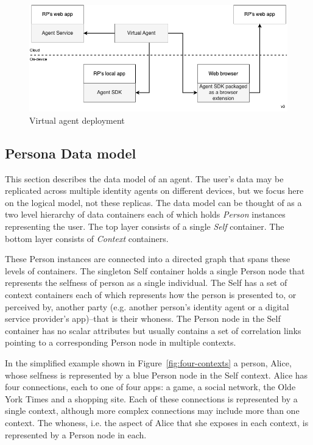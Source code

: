 \documentclass[11pt, oneside]{article}   	%
\begin{document}
\begin{figure}[htbp]
	\includegraphics[width=\textwidth]{./images/virtual-web-app.drawio.png}
	\caption{Virtual agent deployment}
	\label{fig:virtual-agent-deployment}
\end{figure}

\subsection{Persona Data model}\label{data_model_subsection} 

This section describes the data model of an agent. The user's data may be replicated across multiple identity agents on different devices, but we focus here on the logical model, not these replicas. The data model can be thought of as a two level hierarchy of data containers each of which holds \emph{Person} instances representing the user. The top layer consists of a single \emph{Self} container. The bottom layer consists of \emph{Context} containers.

These Person instances are connected into a directed graph that spans these  levels of containers. The singleton Self container holds a single Person node that represents the selfness of person as a single individual. The Self has a set of context containers each of which represents how the person is presented to, or perceived by, another party (e.g. another person's identity agent or a digital service provider's app)--that is their whoness. The Person node in the Self container has no scalar attributes but usually contains a set of correlation links pointing to a corresponding Person node in multiple contexts.

In the simplified example shown in Figure~\ref{fig:four-contexts} a person, Alice, whose selfness is represented by a blue Person node in the Self context. Alice has four connections, each to one of four apps: a game, a social network, the Olde York Times and a shopping site. Each of these connections is represented by a single context, although more complex connections may include more than one context. The whoness, i.e. the aspect of Alice that she exposes in each context, is represented by a Person node in each.
\end{document}
